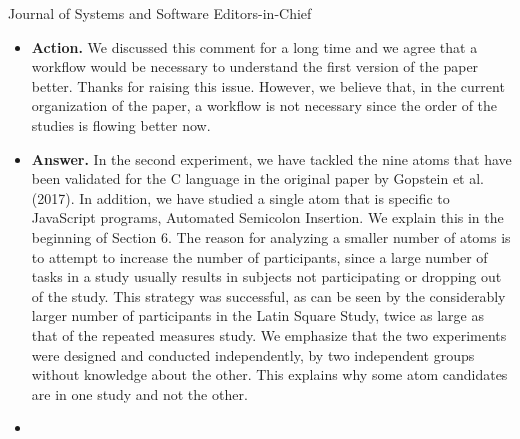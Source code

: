 \documentclass{letter}
\begin{document}
\begin{letter}{Journal of Systems and Software Editors-in-Chief}
\begin{itemize}
{\bf Action.} We have cut about 85 words from the abstract, specifically from the part about the contributions. We avoided cutting more because the paper presents the results of four different studies and the abstract to a certain extent reflects that. 

\item {}

{\bf Action.} We discussed this comment for a long time and we agree that a workflow would be necessary to understand the first version of the paper better. Thanks for raising this issue. However, we believe that, in the current organization of the paper, a workflow is not necessary since the order of the studies is flowing better now. 


\item {}

{\bf Answer.} In the second experiment, we have tackled the nine atoms that have been validated for the C language in the original paper by Gopstein et al. (2017). In addition, we have studied a single atom that is specific to JavaScript programs, Automated Semicolon Insertion. We explain this in the beginning of Section 6. The reason for analyzing a smaller number of atoms is to attempt to increase the number of participants, since a large number of tasks in a study usually results in subjects not participating or dropping out of the study. This strategy was successful, as can be seen by the considerably larger number of participants in the Latin Square Study, twice as large as that of the repeated measures study. We emphasize that the two experiments were designed and conducted independently, by two independent groups without knowledge about the other. This explains why some atom candidates are in one study and not the other.

\item {}


\end{itemize}
\end{letter}
\end{document}
